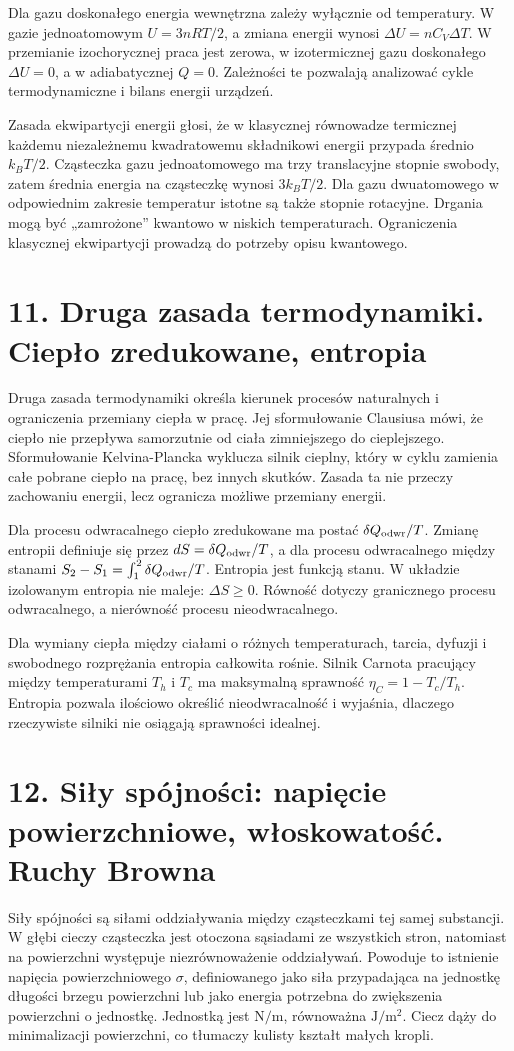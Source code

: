 \documentclass[11pt,a4paper,oneside]{report}
\begin{document}
Dla gazu doskonałego energia wewnętrzna zależy wyłącznie od temperatury. W gazie jednoatomowym \(U=3nRT/2\), a zmiana energii wynosi \(\Delta U=nC_V\Delta T\). W przemianie izochorycznej praca jest zerowa, w izotermicznej gazu doskonałego \(\Delta U=0\), a w adiabatycznej \(Q=0\). Zależności te pozwalają analizować cykle termodynamiczne i bilans energii urządzeń.

Zasada ekwipartycji energii głosi, że w klasycznej równowadze termicznej każdemu niezależnemu kwadratowemu składnikowi energii przypada średnio \(k_BT/2\). Cząsteczka gazu jednoatomowego ma trzy translacyjne stopnie swobody, zatem średnia energia na cząsteczkę wynosi \(3k_BT/2\). Dla gazu dwuatomowego w odpowiednim zakresie temperatur istotne są także stopnie rotacyjne. Drgania mogą być „zamrożone” kwantowo w niskich temperaturach. Ograniczenia klasycznej ekwipartycji prowadzą do potrzeby opisu kwantowego.

\section{11. Druga zasada termodynamiki. Ciepło zredukowane, entropia}
Druga zasada termodynamiki określa kierunek procesów naturalnych i ograniczenia przemiany ciepła w pracę. Jej sformułowanie Clausiusa mówi, że ciepło nie przepływa samorzutnie od ciała zimniejszego do cieplejszego. Sformułowanie Kelvina-Plancka wyklucza silnik cieplny, który w cyklu zamienia całe pobrane ciepło na pracę, bez innych skutków. Zasada ta nie przeczy zachowaniu energii, lecz ogranicza możliwe przemiany energii.

Dla procesu odwracalnego ciepło zredukowane ma postać \(\delta Q_{\rm odwr}/T\). Zmianę entropii definiuje się przez \(dS=\delta Q_{\rm odwr}/T\), a dla procesu odwracalnego między stanami \(S_2-S_1=\int_1^2\delta Q_{\rm odwr}/T\). Entropia jest funkcją stanu. W układzie izolowanym entropia nie maleje: \(\Delta S\geq0\). Równość dotyczy granicznego procesu odwracalnego, a nierówność procesu nieodwracalnego.

Dla wymiany ciepła między ciałami o różnych temperaturach, tarcia, dyfuzji i swobodnego rozprężania entropia całkowita rośnie. Silnik Carnota pracujący między temperaturami \(T_h\) i \(T_c\) ma maksymalną sprawność \(\eta_C=1-T_c/T_h\). Entropia pozwala ilościowo określić nieodwracalność i wyjaśnia, dlaczego rzeczywiste silniki nie osiągają sprawności idealnej.

\section{12. Siły spójności: napięcie powierzchniowe, włoskowatość. Ruchy Browna}
Siły spójności są siłami oddziaływania między cząsteczkami tej samej substancji. W głębi cieczy cząsteczka jest otoczona sąsiadami ze wszystkich stron, natomiast na powierzchni występuje niezrównoważenie oddziaływań. Powoduje to istnienie napięcia powierzchniowego \(\sigma\), definiowanego jako siła przypadająca na jednostkę długości brzegu powierzchni lub jako energia potrzebna do zwiększenia powierzchni o jednostkę. Jednostką jest \(\mathrm{N/m}\), równoważna \(\mathrm{J/m^2}\). Ciecz dąży do minimalizacji powierzchni, co tłumaczy kulisty kształt małych kropli.
\end{document}
